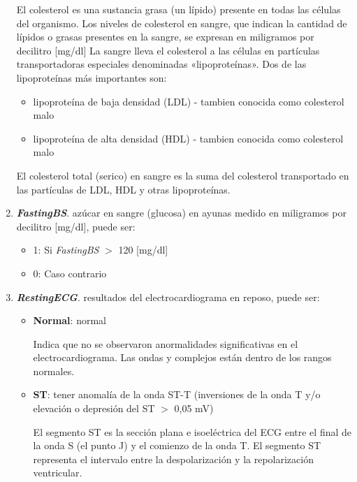 \documentclass[12pt, letterpaper]{article}
\begin{document}
\begin{enumerate}
{    El colesterol es una sustancia grasa (un lípido) presente en todas las células del organismo.
    Los niveles de colesterol en sangre, que indican la cantidad de lípidos o grasas presentes
    en la sangre, se expresan en miligramos por decilitro [mg/dl]
    La sangre lleva el colesterol a las células en partículas transportadoras especiales 
    denominadas «lipoproteínas». Dos de las lipoproteínas más importantes son:
    \begin{itemize}
        \item{lipoproteína de baja densidad (LDL) - tambien conocida como colesterol malo}
        \item{lipoproteína de alta densidad (HDL) - tambien conocida como colesterol malo}
    \end{itemize}

    El colesterol total (serico) en sangre es la suma del colesterol transportado en las 
    partículas de LDL, HDL y otras lipoproteínas. \cite{colesterol}
    }
    \item{\textbf{\textit{FastingBS}}. azúcar en sangre (glucosa) en ayunas
    medido en miligramos por decilitro [mg/dl], puede ser:
    \begin{itemize}
        \item{1: Si \textit{FastingBS} \(>\) 120 [mg/dl]}
        \item{0: Caso contrario}
    \end{itemize}
    }
    \item{\textbf{\textit{RestingECG}}. resultados del electrocardiograma 
    en reposo, puede ser:
    \begin{itemize}
        \item{\textbf{Normal}: normal
        
        Indica que no se observaron anormalidades significativas en el electrocardiograma. 
        Las ondas y complejos están dentro de los rangos normales.
        }
        \item{\textbf{ST}: tener anomalía de la onda ST-T 
        (inversiones de la onda T y/o elevación o depresión del ST \(>\) 0,05 mV)

        El segmento ST es la sección plana e isoeléctrica 
        del ECG entre el final de la onda S (el punto J) y el comienzo de la onda T.
        El segmento ST representa el intervalo entre la despolarización y la repolarización 
        ventricular. \cite{ST}

}
\end{itemize}}
\end{enumerate}
\end{document}

